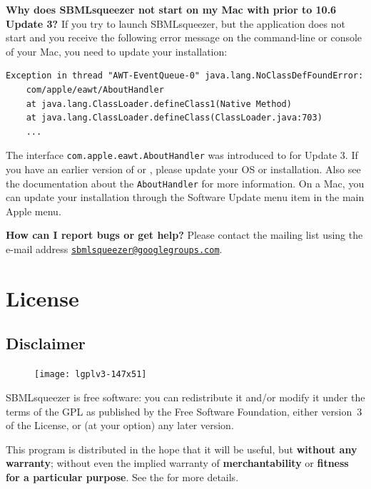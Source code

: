 \noindent \textbf{Why does SBMLsqueezer not start on my Mac with \MacOSX prior to 10.6 Update 3?}\newline
If you try to launch SBMLsqueezer, but the application does not start and you receive the following error message on the command-line or \Java console of your Mac, you need to update your \Java installation:
\begin{verbatim}
Exception in thread "AWT-EventQueue-0" java.lang.NoClassDefFoundError:
    com/apple/eawt/AboutHandler
    at java.lang.ClassLoader.defineClass1(Native Method)
    at java.lang.ClassLoader.defineClass(ClassLoader.java:703)
    ...
\end{verbatim}
The interface \texttt{com.apple.eawt.AboutHandler} was introduced to \Java for  Update 3. If you have an earlier version of \MacOSX or \Java, please update your OS or \Java installation.
Also see the \MacOSX documentation about the \texttt{AboutHandler} for more information. On a Mac, you can update your \Java installation through the Software Update menu item in the main Apple menu.
\newline

\noindent \textbf{How can I report bugs or get help?}\newline
Please contact the mailing list using the e-mail address 
\href{mailto:sbmlsqueezer@googlegroups.com}{\texttt{sbmlsqueezer@google\-groups.com}}.

\chapter{License}

\section{Disclaimer}
\begin{figure}
\vspace{\wrapfigspace}
\texttt{[image: lgplv3-147x51]}
\end{figure}
SBMLsqueezer is free software: you can redistribute it and/or modify
it under the terms of the \acf{GPL} as published by
the Free Software Foundation, either version~3 of the License, or
(at your option) any later version.

This program is distributed in the hope that it will be useful,
but \textbf{without any warranty}; without even the implied warranty of
\textbf{merchantability} or \textbf{fitness for a particular purpose}. See the
 for more details.

